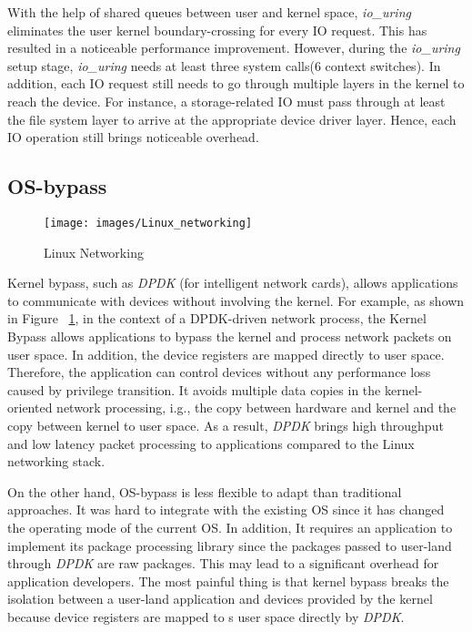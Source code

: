 With the help of shared queues between user and kernel space, 
\emph{io\_uring} eliminates the user kernel boundary-crossing for every
 IO request. This has resulted in a noticeable performance improvement. 
 However, during the \emph{io\_uring} setup stage, \emph{io\_uring} 
 needs at least three system calls(6 context switches). In addition, each IO request still 
 needs to go through multiple layers in the kernel to reach the device. 
 For instance, a storage-related IO must pass through at least the file 
 system layer to arrive at the appropriate device driver layer. Hence, 
 each IO operation still brings noticeable overhead.
\subsection{OS-bypass}
\begin{figure}[tbp]
  \centering
  \texttt{[image: images/Linux\_networking]}
  \caption[Linux Networking]{Linux Networking}
  \label{fig:Linux_networking}
\end{figure}



Kernel bypass, such as \emph{DPDK}\cite{7} (for intelligent network cards), allows applications to communicate 
with devices without involving the kernel. For example, as shown 
in Figure ~\ref{fig:Linux_networking}, in the context of a 
DPDK-driven network process, the Kernel Bypass allows applications 
to bypass the kernel and process network packets on user space. In addition, 
the device registers are mapped directly to user space. 
Therefore, the application can control devices without 
any performance loss caused by privilege transition. 
It avoids multiple data copies in the kernel-oriented network 
processing, i.g., the copy between hardware and kernel and the 
copy between kernel to user space. As a result, \emph{DPDK} brings high 
throughput and low latency packet processing to applications 
compared to the Linux networking stack.

On the other hand, OS-bypass is less flexible to adapt than traditional approaches. It was 
hard to integrate with the existing OS since it has 
changed the operating mode of the current OS. 
In addition, It requires an application to implement its 
package processing library since the packages passed to 
user-land through \emph{DPDK} are raw packages. This may lead to 
a significant overhead for application developers. 
The most painful thing is that kernel bypass breaks 
the isolation between a user-land application and devices
 provided by the kernel because device registers are mapped to
 s user space directly by \emph{DPDK}.

